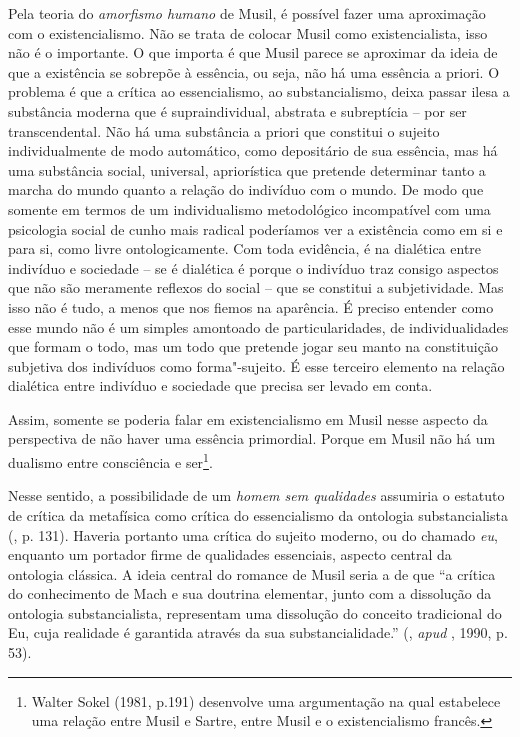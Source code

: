 Pela teoria do \emph{amorfismo humano} de Musil, é possível fazer uma
aproximação com o existencialismo. Não se trata de colocar Musil como
existencialista, isso não é o importante. O que importa é que Musil
parece se aproximar da ideia de que a existência se sobrepõe à essência,
ou seja, não há uma essência a priori. O problema é que a crítica ao
essencialismo, ao substancialismo, deixa passar ilesa a substância
moderna que é supraindividual, abstrata e subreptícia -- por ser
transcendental. Não há uma substância a priori que constitui o sujeito
individualmente de modo automático, como depositário de sua essência, mas há uma
substância social, universal, apriorística que pretende determinar tanto
a marcha do mundo quanto a relação do indivíduo com o mundo. De modo que
somente em termos de um individualismo metodológico incompatível com uma
psicologia social de cunho mais radical poderíamos ver a existência como
em si e para si, como livre ontologicamente. Com toda evidência, é na
dialética entre indivíduo e sociedade -- se é dialética é porque o
indivíduo traz consigo aspectos que não são meramente reflexos do social
-- que se constitui a subjetividade. Mas isso não é tudo, a menos que
nos fiemos na aparência. É preciso entender como esse mundo não é um
simples amontoado de particularidades, de individualidades que formam o
todo, mas um todo que pretende jogar seu manto na constituição subjetiva
dos indivíduos como forma"-sujeito. É esse terceiro elemento na relação
dialética entre indivíduo e sociedade que precisa ser levado em conta.

Assim, somente se poderia falar em existencialismo em Musil nesse
aspecto da perspectiva de não haver uma essência primordial. Porque em
Musil não há um dualismo entre consciência e ser\footnote{Walter Sokel
  (1981, p.191) desenvolve uma argumentação na qual estabelece uma
  relação entre Musil e Sartre, entre Musil e o existencialismo francês.}.

Nesse sentido, a possibilidade de um \emph{homem sem qualidades} assumiria
o estatuto de crítica da metafísica como crítica do
essencialismo da ontologia substancialista (, p. 131). Haveria
portanto uma crítica do sujeito moderno, ou do chamado \emph{eu},
enquanto um portador firme de qualidades essenciais, aspecto central da
ontologia clássica. A ideia central do romance de Musil seria a de que
``a crítica do conhecimento de Mach e sua doutrina elementar, junto com
a dissolução da ontologia substancialista, representam uma dissolução do
conceito tradicional do Eu, cuja realidade é garantida através da sua
substancialidade.'' (, \emph{apud} , 1990, p. 53).


